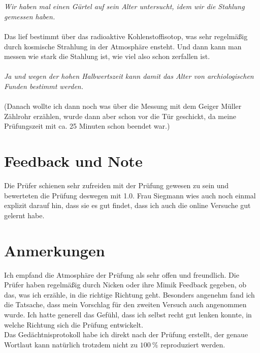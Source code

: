 \\\\\noindent
\textit{Wir haben mal einen Gürtel auf sein Alter untersucht, idem wir die Stahlung gemessen haben.}
\\\\\noindent
Das lief bestimmt über das radioaktive Kohlenstoffisotop, was sehr regelmäßig durch kosmische Strahlung in der Atmosphäre ensteht. Und 
dann kann man messen wie stark die Stahlung ist, wie viel also schon zerfallen ist. 
\\\\\noindent
\textit{Ja und wegen der hohen Halbwertszeit kann damit das Alter von archiologischen Funden bestimmt werden.}
\\\\\noindent
(Danach wollte ich dann noch was über die Messung mit dem Geiger Müller Zählrohr erzählen, wurde dann aber schon vor die Tür geschickt,
da meine Prüfungszeit mit ca. 25 Minuten schon beendet war.)

\section{Feedback und Note}
Die Prüfer schienen sehr zufreiden mit der Prüfung gewesen zu sein und bewerteten die Prüfung deswegen mit 1.0. Frau Siegmann wies auch noch
einmal explizit darauf hin, dass sie es gut findet, dass ich auch die online Versuche gut gelernt habe. 

\section{Anmerkungen}
Ich empfand die Atmosphäre der Prüfung als sehr offen und freundlich. Die Prüfer haben regelmäßig durch Nicken oder ihre Mimik Feedback gegeben,
ob das, was ich erzähle, in die richtige Richtung geht. Besonders angenehm fand ich die Tatsache, dass mein Vorschlag für den zweiten 
Versuch auch angenommen wurde. Ich hatte generell das Gefühl, dass ich selbst recht gut lenken konnte, in welche Richtung
sich die Prüfung entwickelt.
\\\noindent
Das Gedächtnisprotokoll habe ich direkt nach der Prüfung erstellt, der genaue Wortlaut kann natürlich trotzdem nicht zu $\SI{100}{\percent}$
reproduziert werden.
